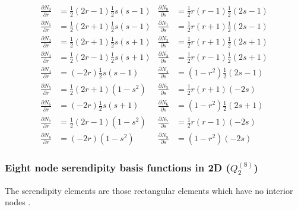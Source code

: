 \begin{mdframed}[backgroundcolor=blue!5]
\begin{align}
\frac{\partial N_0}{\partial r}&= \frac{1}{2}(2r-1)  \frac{1}{2}s(s-1) & 
\frac{\partial N_0}{\partial s}&= \frac{1}{2}r(r-1)  \frac{1}{2}(2s-1)\nonumber\\
\frac{\partial N_1}{\partial r}&= \frac{1}{2}(2r+1)  \frac{1}{2}s(s-1) &
\frac{\partial N_1}{\partial s}&= \frac{1}{2}r(r+1)  \frac{1}{2}(2s-1)\nonumber\\
\frac{\partial N_2}{\partial r}&= \frac{1}{2}(2r+1)  \frac{1}{2}s(s+1) &
\frac{\partial N_2}{\partial s}&= \frac{1}{2}r(r+1)  \frac{1}{2}(2s+1)\nonumber\\
\frac{\partial N_3}{\partial r}&= \frac{1}{2}(2r-1)  \frac{1}{2}s(s+1) &
\frac{\partial N_3}{\partial s}&= \frac{1}{2}r(r-1)  \frac{1}{2}(2s+1)\nonumber\\
\frac{\partial N_4}{\partial r}&=       (-2r)  \frac{1}{2}s(s-1) &
\frac{\partial N_4}{\partial s}&=     (1-r^2)  \frac{1}{2}(2s-1)\nonumber\\
\frac{\partial N_5}{\partial r}&= \frac{1}{2}(2r+1)     (1-s^2)&
\frac{\partial N_5}{\partial s}&= \frac{1}{2}r(r+1)        (-2s)\nonumber\\
\frac{\partial N_6}{\partial r}&=       (-2r)  \frac{1}{2}s(s+1)&
\frac{\partial N_6}{\partial s}&=     (1-r^2)  \frac{1}{2}(2s+1)\nonumber\\
\frac{\partial N_7}{\partial r}&= \frac{1}{2}(2r-1)     (1-s^2)&
\frac{\partial N_7}{\partial s}&= \frac{1}{2}r(r-1)        (-2s)\nonumber\\
\frac{\partial N_8}{\partial r}&=       (-2r)     (1-s^2)&
\frac{\partial N_8}{\partial s}&=     (1-r^2)        (-2s)\nonumber
\end{align}
\end{mdframed}



\subsubsection{Eight node serendipity basis functions in 2D ($Q_2^{(8)}$)}
\label{sec:serendipity2D}
 

The serendipity elements are those rectangular elements which have no
interior nodes \cite[p65]{reddybook2}.

